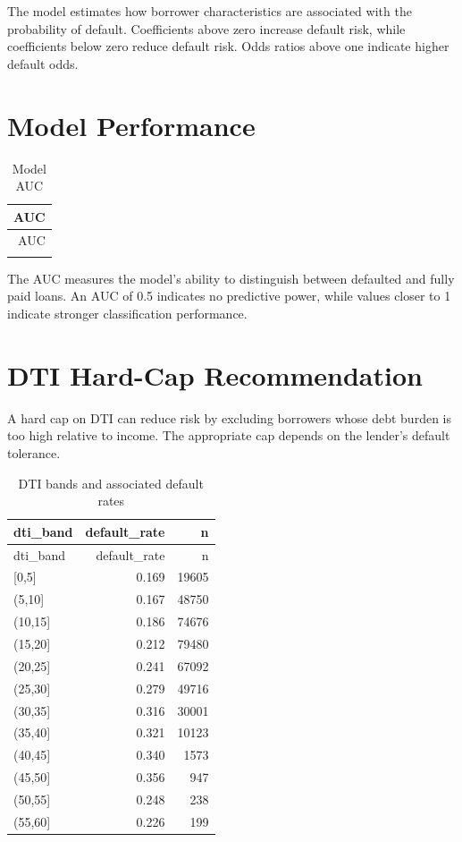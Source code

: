 \documentclass[11pt,preprint]{elsarticle}
\numberwithin{equation}{section}
\numberwithin{figure}{section}
\numberwithin{table}{section}
\begin{document}
The model estimates how borrower characteristics are associated with the
probability of default. Coefficients above zero increase default risk,
while coefficients below zero reduce default risk. Odds ratios above one
indicate higher default odds.

\section{Model Performance}\label{model-performance}

\begin{longtable}[]{@{}r@{}}
\caption{Model AUC}\tabularnewline
\toprule\noalign{}
AUC \\
\midrule\noalign{}
\endfirsthead
\toprule\noalign{}
AUC \\
\midrule\noalign{}
\endhead
\bottomrule\noalign{}
\endlastfoot
0.709 \\
\end{longtable}

The AUC measures the model's ability to distinguish between defaulted
and fully paid loans. An AUC of 0.5 indicates no predictive power, while
values closer to 1 indicate stronger classification performance.

\section{DTI Hard-Cap Recommendation}\label{dti-hard-cap-recommendation}

A hard cap on DTI can reduce risk by excluding borrowers whose debt
burden is too high relative to income. The appropriate cap depends on
the lender's default tolerance.

\begin{longtable}[]{@{}lrr@{}}
\caption{DTI bands and associated default rates}\tabularnewline
\toprule\noalign{}
dti\_band & default\_rate & n \\
\midrule\noalign{}
\endfirsthead
\toprule\noalign{}
dti\_band & default\_rate & n \\
\midrule\noalign{}
\endhead
\bottomrule\noalign{}
\endlastfoot
{[}0,5{]} & 0.169 & 19605 \\
(5,10{]} & 0.167 & 48750 \\
(10,15{]} & 0.186 & 74676 \\
(15,20{]} & 0.212 & 79480 \\
(20,25{]} & 0.241 & 67092 \\
(25,30{]} & 0.279 & 49716 \\
(30,35{]} & 0.316 & 30001 \\
(35,40{]} & 0.321 & 10123 \\
(40,45{]} & 0.340 & 1573 \\
(45,50{]} & 0.356 & 947 \\
(50,55{]} & 0.248 & 238 \\
(55,60{]} & 0.226 & 199 \\
\end{longtable}
\end{document}
